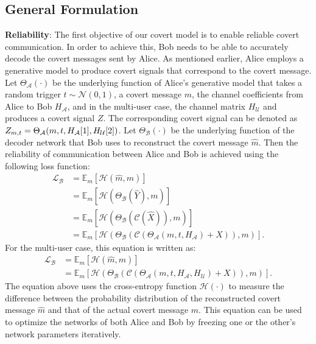 \subsection{General Formulation}
\textbf{Reliability}: The first objective of our covert model is to enable reliable covert communication. In order to achieve this, Bob needs to be able to accurately decode the covert messages sent by Alice. As mentioned earlier, Alice employs a generative model to produce covert signals that correspond to the covert message. Let \(\Theta_{\mathcal{A}}(\cdot)\) be the underlying function of Alice's generative model that takes a random trigger \(t \sim \mathcal{N}(0, 1)\), a covert message \(m\), the channel coefficients from Alice to Bob \(H_{\mathcal{A}}\), and in the multi-user case, the channel matrix \(H_{\mathcal{U}}\) and produces a covert signal \(Z\). The corresponding covert signal can be denoted as \(Z_{m, t} = \Theta_{\mathcal{A}}(m, t, H_{\mathcal{A}}[1], H_{\mathcal{U}}[2])\). Let  \(\Theta_{\mathcal{B}}(\cdot)\) be the underlying function of the decoder network that Bob uses to reconstruct the covert message \(\hat{m}\). Then the reliability of communication between Alice and Bob is achieved using the following loss function:
\begin{equation}
	\begin{aligned} \label{bob_loss}
		\mathcal{L}_{\mathcal{B}} & = \mathbb{E}_{m}[\mathcal{H}(\hat{m}, m)] \\
		& = \mathbb{E}_{m}[\mathcal{H}(\Theta_{\mathcal{B}}(\hat{Y}), m)] \\ 
		& = \mathbb{E}_{m}[\mathcal{H}(\Theta_{\mathcal{B}}(\mathcal{C}(\hat{X})), m)] \\ 
		& = \mathbb{E}_{m}[\mathcal{H}(\Theta_{\mathcal{B}}(\mathcal{C}(\Theta_{\mathcal{A}}(m, t, H_{\mathcal{A}}) + X)), m)].
	\end{aligned}
\end{equation}
For the multi-user case, this equation is written as:
\begin{equation}
	\begin{aligned}
		\mathcal{L}_{\mathcal{B}} & = \mathbb{E}_{m}[\mathcal{H}(\hat{m}, m)] \\
		& = \mathbb{E}_{m}[\mathcal{H}(\Theta_{\mathcal{B}}(\mathcal{C}(\Theta_{\mathcal{A}}(m, t, H_{\mathcal{A}}, H_{\mathcal{U}}) + X)), m)].
	\end{aligned}
\end{equation}
The equation above uses the cross-entropy function \(\mathcal{H}(\cdot)\) to measure the difference between the probability distribution of the reconstructed covert message \(\hat{m}\) and that of the actual covert message \(m\). This equation can be used to optimize the networks of both Alice and Bob by freezing one or the other's network parameters iteratively.

